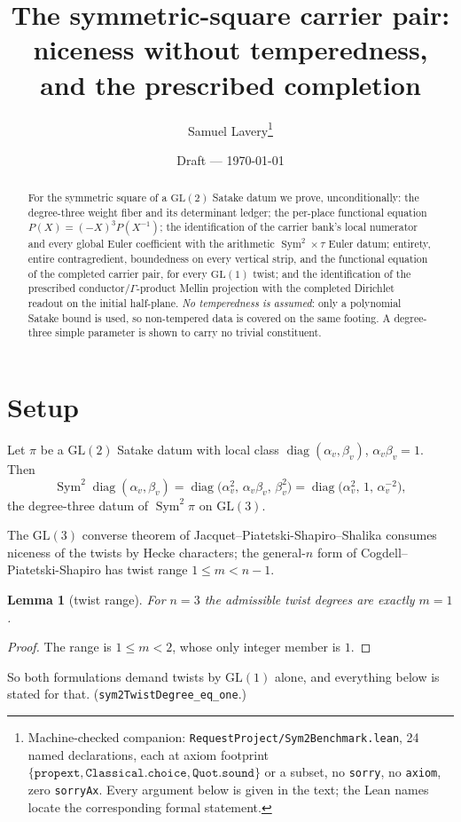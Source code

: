\documentclass[11pt]{article}
\title{The symmetric-square carrier pair:\\
niceness without temperedness, and the prescribed completion}
\author{Samuel Lavery\thanks{Machine-checked companion:
\texttt{RequestProject/Sym2Benchmark.lean}, 24 named declarations, each at axiom footprint
$\{\texttt{propext},\texttt{Classical.choice},\texttt{Quot.sound}\}$ or a subset, no
\texttt{sorry}, no \texttt{axiom}, zero \texttt{sorryAx}. Every argument below is given in the
text; the Lean names locate the corresponding formal statement.}}
\date{Draft --- \today}
\newtheorem{lemma}[theorem]{Lemma}
\newcommand{\Sym}{\operatorname{Sym}}
\begin{document}
\maketitle

\begin{abstract}
For the symmetric square of a $\mathrm{GL}(2)$ Satake datum we prove, unconditionally: the
degree-three weight fiber and its determinant ledger; the per-place functional equation
$P(X)=(-X)^3P(X^{-1})$; the identification of the carrier bank's local numerator and every global
Euler coefficient with the arithmetic $\Sym^2\!\times\tau$ Euler datum; entirety, entire
contragredient, boundedness on every vertical strip, and the functional equation of the completed
carrier pair, for every $\mathrm{GL}(1)$ twist; and the identification of the prescribed
conductor/$\Gamma$-product Mellin projection with the completed Dirichlet readout on the initial
half-plane. \emph{No temperedness is assumed}: only a polynomial Satake bound is used, so
non-tempered data is covered on the same footing. A degree-three simple parameter is shown to carry
no trivial constituent.
\end{abstract}

\section{Setup}

Let $\pi$ be a $\mathrm{GL}(2)$ Satake datum with local class
$\operatorname{diag}(\alpha_v,\beta_v)$, $\alpha_v\beta_v=1$. Then
\[
  \Sym^2\operatorname{diag}(\alpha_v,\beta_v)
   =\operatorname{diag}\bigl(\alpha_v^{2},\,\alpha_v\beta_v,\,\beta_v^{2}\bigr)
   =\operatorname{diag}\bigl(\alpha_v^{2},\,1,\,\alpha_v^{-2}\bigr),
\]
the degree-three datum of $\Sym^2\pi$ on $\mathrm{GL}(3)$.

The $\mathrm{GL}(3)$ converse theorem of Jacquet--Piatetski-Shapiro--Shalika \cite{JPSS} consumes
niceness of the twists by Hecke characters; the general-$n$ form of
Cogdell--Piatetski-Shapiro \cite{CPS} has twist range $1\le m<n-1$.

\begin{lemma}[twist range]\label{lem:range}
For $n=3$ the admissible twist degrees are exactly $m=1$.
\end{lemma}
\begin{proof}
The range is $1\le m<2$, whose only integer member is $1$.
\end{proof}

So both formulations demand twists by $\mathrm{GL}(1)$ alone, and everything below is stated for
that. (\texttt{sym2TwistDegree\_eq\_one}.)
\end{document}
